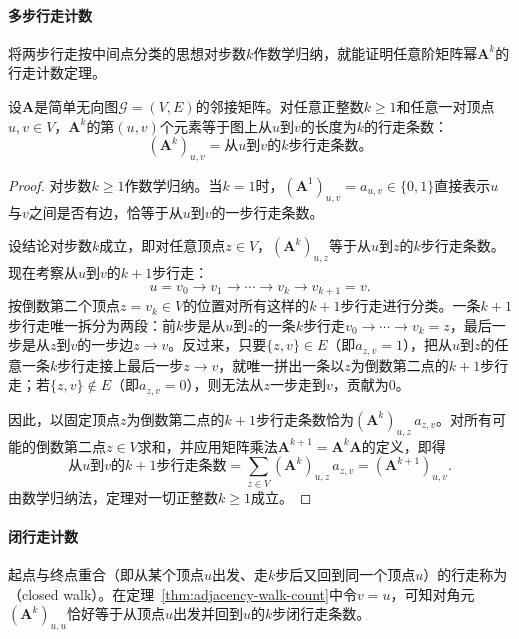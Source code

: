 \paragraph{多步行走计数}

将两步行走按中间点分类的思想对步数$k$作数学归纳，就能证明任意阶矩阵幂$\bm A^k$的行走计数定理。

\begin{theorem}[邻接矩阵幂的行走计数]
\label{thm:adjacency-walk-count}
设$\bm A$是简单无向图$\mathcal G=(V,E)$的邻接矩阵。对任意正整数$k\geq 1$和任意一对顶点$u,v\in V$，$\bm A^k$的第$(u,v)$个元素等于图上从$u$到$v$的长度为$k$的行走条数：
\begin{equation}
(\bm A^k)_{u,v}=\text{从$u$到$v$的$k$步行走条数。}
\label{eq:adjacency-walk-count}
\end{equation}
\end{theorem}

\begin{proof}
对步数$k\geq 1$作数学归纳。当$k=1$时，$(\bm A^1)_{u,v}=a_{u,v}\in\{0,1\}$直接表示$u$与$v$之间是否有边，恰等于从$u$到$v$的一步行走条数。

设结论对步数$k$成立，即对任意顶点$z\in V$，$(\bm A^k)_{u,z}$等于从$u$到$z$的$k$步行走条数。现在考察从$u$到$v$的$k+1$步行走：
\[
u=v_0\to v_1\to\cdots\to v_k\to v_{k+1}=v.
\]
按倒数第二个顶点$z=v_k\in V$的位置对所有这样的$k+1$步行走进行分类。一条$k+1$步行走唯一拆分为两段：前$k$步是从$u$到$z$的一条$k$步行走$v_0\to\cdots\to v_k=z$，最后一步是从$z$到$v$的一步边$z\to v$。反过来，只要$\{z,v\}\in E$（即$a_{z,v}=1$），把从$u$到$z$的任意一条$k$步行走接上最后一步$z\to v$，就唯一拼出一条以$z$为倒数第二点的$k+1$步行走；若$\{z,v\}\notin E$（即$a_{z,v}=0$），则无法从$z$一步走到$v$，贡献为$0$。

因此，以固定顶点$z$为倒数第二点的$k+1$步行走条数恰为$(\bm A^k)_{u,z}\,a_{z,v}$。对所有可能的倒数第二点$z\in V$求和，并应用矩阵乘法$\bm A^{k+1}=\bm A^k\bm A$的定义，即得
\[
\text{从$u$到$v$的$k+1$步行走条数}
=\sum_{z\in V}(\bm A^k)_{u,z}\,a_{z,v}
=(\bm A^{k+1})_{u,v}.
\]
由数学归纳法，定理对一切正整数$k\geq 1$成立。
\end{proof}

\paragraph{闭行走计数}

起点与终点重合（即从某个顶点$u$出发、走$k$步后又回到同一个顶点$u$）的行走称为（closed walk）。在定理~\ref{thm:adjacency-walk-count}中令$v=u$，可知对角元$(\bm A^k)_{u,u}$恰好等于从顶点$u$出发并回到$u$的$k$步闭行走条数。


